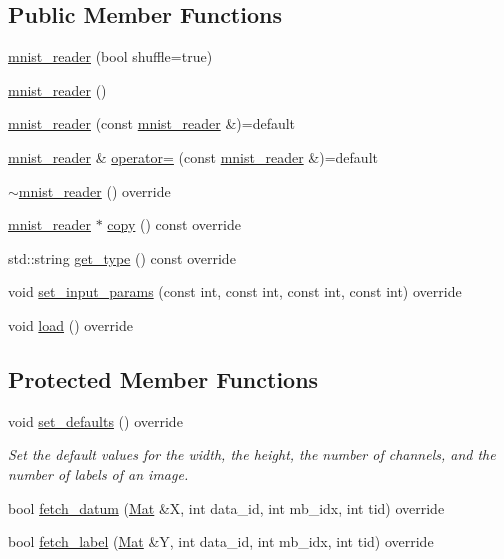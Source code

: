 \subsection*{Public Member Functions}
\begin{DoxyCompactItemize}
\item 
\hyperlink{classlbann_1_1mnist__reader_abe2c3dd2e8d5ad42ec762fdd37bc9769}{mnist\+\_\+reader} (bool shuffle=true)
\item 
\hyperlink{classlbann_1_1mnist__reader_a7634b11fdfc3501bd75d60c567158cbf}{mnist\+\_\+reader} ()
\item 
\hyperlink{classlbann_1_1mnist__reader_a0a7d55ae11467bd779695014817a30ec}{mnist\+\_\+reader} (const \hyperlink{classlbann_1_1mnist__reader}{mnist\+\_\+reader} \&)=default
\item 
\hyperlink{classlbann_1_1mnist__reader}{mnist\+\_\+reader} \& \hyperlink{classlbann_1_1mnist__reader_aa9b6da319cff8e68aa91013ae250a014}{operator=} (const \hyperlink{classlbann_1_1mnist__reader}{mnist\+\_\+reader} \&)=default
\item 
\hyperlink{classlbann_1_1mnist__reader_a8369d1f8aff2c8a7d8b64e387f56981c}{$\sim$mnist\+\_\+reader} () override
\item 
\hyperlink{classlbann_1_1mnist__reader}{mnist\+\_\+reader} $\ast$ \hyperlink{classlbann_1_1mnist__reader_a208410f6f1947b943569a3d90c8de451}{copy} () const override
\item 
std\+::string \hyperlink{classlbann_1_1mnist__reader_a23c5602f4c0a98ee915f33e434c60d80}{get\+\_\+type} () const override
\item 
void \hyperlink{classlbann_1_1mnist__reader_aa50ae6f2aeb5800de0e15e3ab9046338}{set\+\_\+input\+\_\+params} (const int, const int, const int, const int) override
\item 
void \hyperlink{classlbann_1_1mnist__reader_aacbd6c4dec95b9849083d96e0005b392}{load} () override
\end{DoxyCompactItemize}
\subsection*{Protected Member Functions}
\begin{DoxyCompactItemize}
\item 
void \hyperlink{classlbann_1_1mnist__reader_a5b9a3d56e2d1e1c6820b3c7cc8cde17d}{set\+\_\+defaults} () override
\begin{DoxyCompactList}\small\item\em Set the default values for the width, the height, the number of channels, and the number of labels of an image. \end{DoxyCompactList}\item 
bool \hyperlink{classlbann_1_1mnist__reader_af257b58b61ae9f3f623f1cb5d18c4841}{fetch\+\_\+datum} (\hyperlink{base_8hpp_a68f11fdc31b62516cb310831bbe54d73}{Mat} \&X, int data\+\_\+id, int mb\+\_\+idx, int tid) override
\item 
bool \hyperlink{classlbann_1_1mnist__reader_a62404e18f0d114b99c11f3800c0d7451}{fetch\+\_\+label} (\hyperlink{base_8hpp_a68f11fdc31b62516cb310831bbe54d73}{Mat} \&Y, int data\+\_\+id, int mb\+\_\+idx, int tid) override
\end{DoxyCompactItemize}
